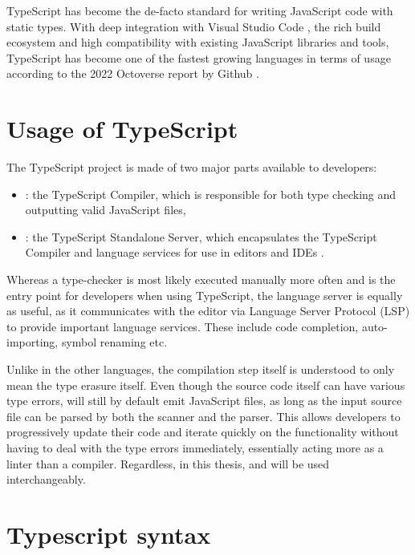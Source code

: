 TypeScript has become the de-facto standard for writing JavaScript code with static types. With deep integration with Visual Studio Code \cite{VisualStudioCode}, the rich build ecosystem and high compatibility with existing JavaScript libraries and tools, TypeScript has become one of the fastest growing languages in terms of usage according to the 2022 Octoverse report by Github \cite{Octoverse2022State}.

\section{Usage of TypeScript}

The TypeScript project is made of two major parts available to developers:

\begin{itemize}
  \item {}: the TypeScript Compiler, which is responsible for both type checking and outputting valid JavaScript files,
  \item {}: the TypeScript Standalone Server, which encapsulates the TypeScript Compiler and language services for use in editors and IDEs \cite{StandaloneServerTsserver}.
\end{itemize}

Whereas a type-checker is most likely executed manually more often and is the entry point for developers when using TypeScript, the language server is equally as useful, as it communicates with the editor via Language Server Protocol (LSP) to provide important language services. These include code completion, auto-importing, symbol renaming etc.

Unlike in the other languages, the compilation step itself is understood to only mean the type erasure itself. Even though the source code itself can have various type errors,  will still by default emit JavaScript files, as long as the input source file can be parsed by both the scanner and the parser. This allows developers to progressively update their code and iterate quickly on the functionality without having to deal with the type errors immediately, essentially acting more as a linter than a compiler. Regardless, in this thesis,  and  will be used interchangeably.

\section{Typescript syntax}

